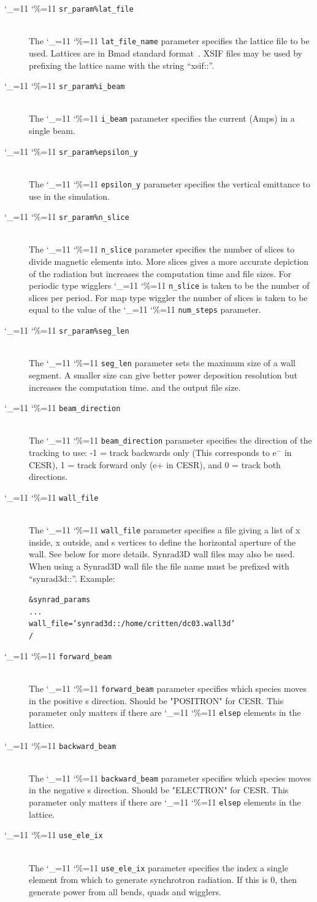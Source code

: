 \documentclass[11pt]{article}
\newcommand\ttcmd{\begingroup\catcode`\_=11 \catcode`\%=11 \dottcmd}
\newcommand\dottcmd[1]{\texttt{#1}\endgroup}
\newcommand{\vn}{\ttcmd}
\newcommand{\Newline}{\hfil \\}
\newenvironment{example}
  {\vspace{-3.0ex} \begin{alltt}}
  {\end{alltt} \vspace{-2.5ex}}
\begin{document}
  \begin{description}
  \item[\vn{sr_param\%lat_file}] \Newline
The \vn{lat_file_name} parameter specifies the lattice file to be
used.  Lattices are in Bmad standard format~\cite{b:bmad}. XSIF files may
be used by prefixing the lattice name with the string ``xsif::''.
  \item[\vn{sr_param\%i_beam}] \Newline
The \vn{i_beam} parameter specifies the current (Amps) in a single beam.
  \item[\vn{sr_param\%epsilon_y}] \Newline
The \vn{epsilon_y} parameter specifies the vertical emittance to use 
in the simulation.
  \item[\vn{sr_param\%n_slice}] \Newline
The \vn{n_slice} parameter specifies the number of slices to divide
magnetic elements into.  More slices gives a more accurate depiction 
of the radiation but increases the computation time and file sizes. 
For periodic type wigglers \vn{n_slice} is taken to be the
number of slices per period. For map type wiggler the number of slices is
taken to be equal to the value of the \vn{num_steps} parameter.
  \item[\vn{sr_param\%seg_len}] \Newline
The \vn{seg_len} parameter sets the maximum size of a wall segment. 
A smaller size can give better power deposition resolution but 
increases the computation time. and the output file size.
  \item[\vn{beam_direction}] \Newline
The \vn{beam_direction} parameter specifies the direction of the
tracking to use: -1 = track backwards only (This corresponds to e$^-$
in CESR), 1 = track forward only (e+ in CESR), and 0 = track both
directions.
  \item[\vn{wall_file}] \Newline
The \vn{wall_file} parameter specifies a file giving a list of x
inside, x outside, and s vertices to define the horizontal aperture of
the wall. See below for more details. Synrad3D wall files may also be
used. When using a Synrad3D wall file the file name must be prefixed
with ``synrad3d::''. Example:
\begin{example}
  &synrad_params
    ...
    wall_file = 'synrad3d::/home/critten/dc03.wall3d'
  /
\end{example}
  \item[\vn{forward_beam}] \Newline
The \vn{forward_beam} parameter specifies which species moves in the
positive s direction.  Should be "POSITRON" for CESR. This parameter
only matters if there are \vn{elsep} elements in the lattice.
  \item[\vn{backward_beam}] \Newline
The \vn{backward_beam} parameter specifies which species moves in the
negative s direction.  Should be "ELECTRON" for CESR. This parameter
only matters if there are \vn{elsep} elements in the lattice.
  \item[\vn{use_ele_ix}] \Newline
The \vn{use_ele_ix} parameter specifies the index a single element 
from which to generate synchrotron radiation.  If this is 0, then
generate power from all bends, quads and wigglers.
  \end{description}
\end{document}
